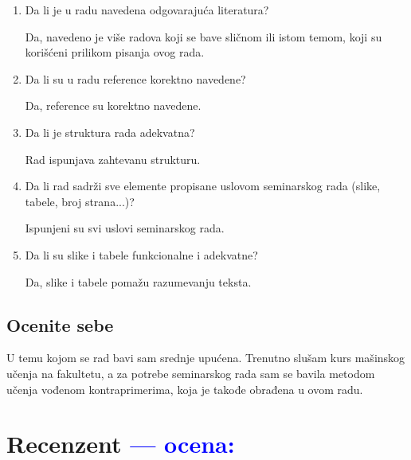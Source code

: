 \documentclass[a4paper]{report}
\newcommand{\odgovor}[1]{\textcolor{blue}{#1}}
\begin{document}
\begin{enumerate}
\item Da li je u radu navedena odgovarajuća literatura?

Da, navedeno je više radova koji se bave sličnom ili istom temom, koji su korišćeni prilikom pisanja ovog rada.

\item Da li su u radu reference korektno navedene?
 
Da, reference su korektno navedene.

\item Da li je struktura rada adekvatna?

Rad ispunjava zahtevanu strukturu.

\item Da li rad sadrži sve elemente propisane uslovom seminarskog rada (slike, tabele, broj strana...)?

Ispunjeni su svi uslovi seminarskog rada.

\item Da li su slike i tabele funkcionalne i adekvatne?

Da, slike i tabele pomažu razumevanju teksta.

\end{enumerate}

\section{Ocenite sebe}

U temu kojom se rad bavi sam srednje upućena. Trenutno slušam kurs mašinskog učenja na fakultetu, a za potrebe seminarskog rada sam se bavila metodom učenja vođenom kontraprimerima, koja je takođe obrađena u ovom radu.


\chapter{Recenzent \odgovor{--- ocena:} }
\end{document}
